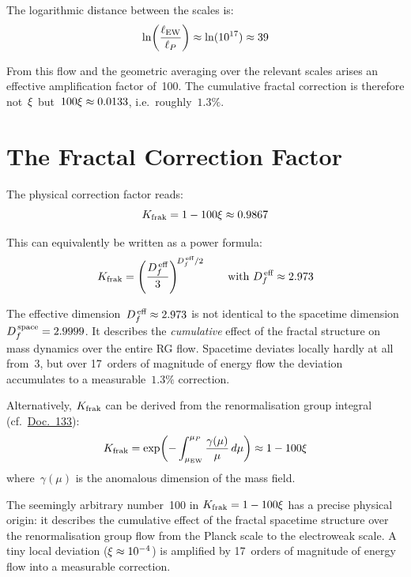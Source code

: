The logarithmic distance between the scales is:
\begin{equation}
\ln\!\left(\frac{\ell_{\text{EW}}}{\ell_P}\right) \approx \ln(10^{17}) \approx 39
\end{equation}

From this flow and the geometric averaging over the relevant scales arises an effective amplification factor of~100. The cumulative fractal correction is therefore not~$\xi$ but~$100\xi \approx 0.0133$, i.e.\ roughly~$1.3\%$.

\section{The Fractal Correction Factor}

The physical correction factor reads:
\begin{equation}
K_{\text{frak}} = 1 - 100\xi \approx 0.9867
\end{equation}

This can equivalently be written as a power formula:
\begin{equation}
K_{\text{frak}} = \left(\frac{D_f^{\,\text{eff}}}{3}\right)^{\!D_f^{\,\text{eff}}/2} \qquad \text{with } D_f^{\,\text{eff}} \approx 2.973
\end{equation}

The effective dimension~$D_f^{\,\text{eff}} \approx 2.973$ is not identical to the spacetime dimension~$D_f^{\,\text{space}} = 2.9999$. It describes the \emph{cumulative} effect of the fractal structure on mass dynamics over the entire RG flow. Spacetime deviates locally hardly at all from~3, but over 17~orders of magnitude of energy flow the deviation accumulates to a measurable~$1.3\%$ correction.

Alternatively, $K_{\text{frak}}$ can be derived from the renormalisation group integral (cf.\ \href{https://github.com/jpascher/T0-Time-Mass-Duality/blob/main/2/pdf/133_Fraktale_Korrektur_Herleitung_De.pdf}{Doc.~133}):
\begin{equation}
K_{\text{frak}} = \exp\!\left(-\int_{\mu_{\text{EW}}}^{\mu_P} \frac{\gamma(\mu)}{\mu}\,d\mu\right) \approx 1 - 100\xi
\end{equation}
where~$\gamma(\mu)$ is the anomalous dimension of the mass field.

\begin{kerngedanke}
The seemingly arbitrary number~100 in $K_{\text{frak}} = 1 - 100\xi$ has a precise physical origin: it describes the cumulative effect of the fractal spacetime structure over the renormalisation group flow from the Planck scale to the electroweak scale. A tiny local deviation ($\xi \approx 10^{-4}$) is amplified by 17~orders of magnitude of energy flow into a measurable correction.
\end{kerngedanke}

